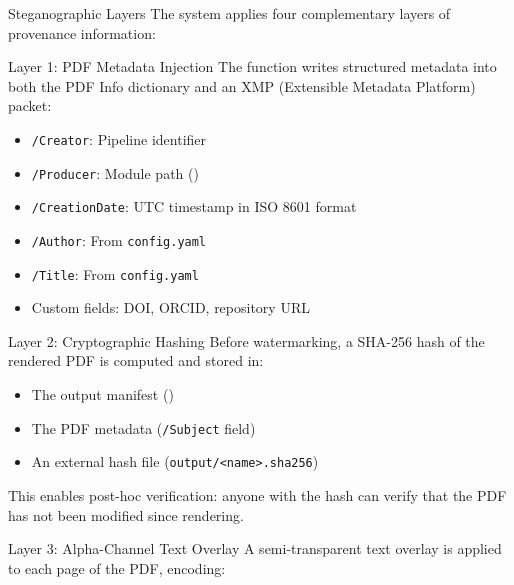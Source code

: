 \documentclass[
  ignorenonframetext,
]{beamer}
\providecommand{\tightlist}{%
  \setlength{\itemsep}{0pt}\setlength{\parskip}{0pt}}
\begin{document}
\begin{frame}{Steganographic Layers}
\protect{}\label{steganographic-layers}
The system applies four complementary layers of provenance information:

\begin{block}{Layer 1: PDF Metadata Injection}
\protect{}\label{layer-1-pdf-metadata-injection}
The  function writes structured metadata
into both the PDF Info dictionary and an XMP (Extensible Metadata
Platform) packet:

\begin{itemize}
\tightlist
\item
  \texttt{/Creator}: Pipeline identifier
\item
  \texttt{/Producer}: Module path
  ()
\item
  \texttt{/CreationDate}: UTC timestamp in ISO 8601 format
\item
  \texttt{/Author}: From \texttt{config.yaml}
\item
  \texttt{/Title}: From \texttt{config.yaml}
\item
  Custom fields: DOI, ORCID, repository URL
\end{itemize}
\end{block}

\begin{block}{Layer 2: Cryptographic Hashing}
\protect{}\label{layer-2-cryptographic-hashing}
Before watermarking, a SHA-256 hash of the rendered PDF is computed and
stored in:

\begin{itemize}
\tightlist
\item
  The output manifest ()
\item
  The PDF metadata (\texttt{/Subject} field)
\item
  An external hash file
  (\texttt{output/\textless{}name\textgreater{}.sha256})
\end{itemize}

This enables post-hoc verification: anyone with the hash can verify that
the PDF has not been modified since rendering.
\end{block}

\begin{block}{Layer 3: Alpha-Channel Text Overlay}
\protect{}\label{layer-3-alpha-channel-text-overlay}
A semi-transparent text overlay is applied to each page of the PDF,
encoding:


\end{block}
\end{frame}
\end{document}
